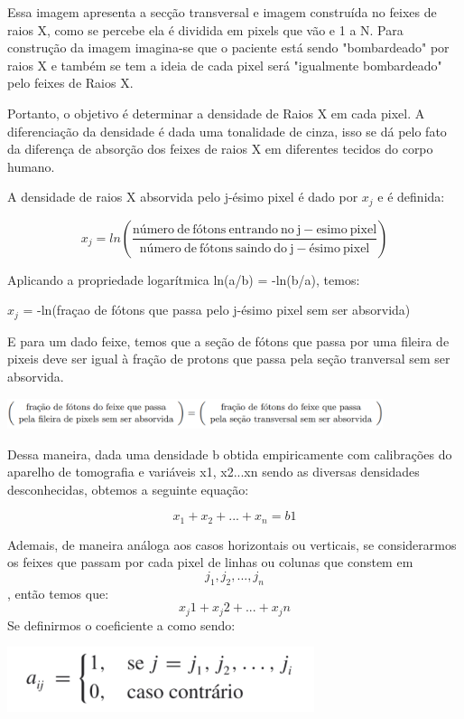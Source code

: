 \documentclass[a4paper, 12pt]{article}
\begin{document}
Essa imagem apresenta a secção transversal e imagem construída no feixes de raios X, como se percebe ela é dividida em pixels que vão e 1 a N. Para construção da imagem imagina-se que o paciente está sendo "bombardeado" por raios X e também se tem a ideia de cada pixel será "igualmente bombardeado" pelo feixes de Raios X.

Portanto, o objetivo é determinar a densidade de Raios X em cada pixel. A diferenciação da densidade é dada uma tonalidade de cinza, isso se dá pelo fato da diferença de absorção dos feixes de raios X em diferentes tecidos do corpo humano.

A densidade de raios X absorvida pelo j-ésimo pixel é dado por $x_j$ e é definida:

   $$x_{j}= ln\left(\frac{\mathrm{número\ de\ fótons\ entrando\ no\ j-esimo\ pixel}}{\begin{matrix}
\mathrm{número\ de\ fótons\ saindo\ do\ j-ésimo\ pixel}
\end{matrix}}\right)$$

Aplicando a propriedade logarítmica ln(a/b) = -ln(b/a), temos:

    $x_j$ = -ln(fraçao de fótons que passa pelo j-ésimo pixel sem ser absorvida)
    
E para um dado feixe, temos que a seção de fótons que passa por uma fileira de pixeis deve ser igual à fração de protons que passa pela seção tranversal sem ser absorvida.


\includegraphics[width=11cm]{figura fluxo.png}


Dessa maneira, dada uma densidade b obtida empiricamente com calibrações do aparelho de tomografia e variáveis x1, x2...xn sendo as diversas densidades desconhecidas, obtemos a seguinte equação:
    
    $$x_1+x_2+...+x_n=b1$$
    
Ademais, de maneira análoga aos casos horizontais ou verticais, se considerarmos os feixes que passam por cada pixel de linhas ou colunas que constem em $$j_1, j_2,..., j_n$$, então temos que:
$$x_j1 + x_j2 + ... + x_jn$$
Se definirmos o coeficiente a como sendo:

\includegraphics[width=9cm]{coef a.png}
\end{document}
